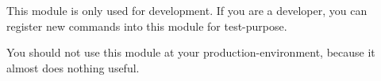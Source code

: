 
This module is only used for development.
If you are a developer, you can register new commands into this module for test-purpose.


\begin{warn}{}
    You should not use this module at your production-environment, because it almost does nothing useful.
\end{warn}

